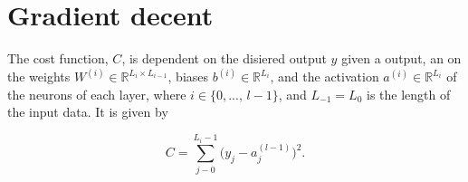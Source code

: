 \section*{Gradient decent}
The cost function, $C$, is dependent on the disiered output $y$ given a output, an on  the weights $W^{(i)} \in  \mathbb{R}^{L_i \times L_{i-1}} $, biases $b^{(i)} \in \mathbb{R}^{L_i}$, and the activation $a^(i) \in \mathbb{R}^{L_i}$ of the neurons of each layer, where $ i \in \{0, ..., \,l-1\}$, and $L_{-1} = L_0$ is the length of the input data. It is given by

$$
    C = \sum_{j - 0}^{L_i - 1} \big(y_j - a^{(l - 1)}_j\big)^2.
$$

